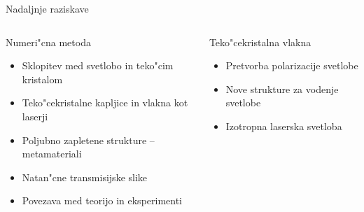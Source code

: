 \documentclass{beamer}
\begin{document}
\begin{frame}{Nadaljnje raziskave}
\begin{columns}

 
 \begin{block}{Numeri"cna metoda}
  \begin{itemize}
   \item Sklopitev med svetlobo in teko"cim kristalom
   \item Teko"cekristalne kapljice in vlakna kot laserji
   \item Poljubno zapletene strukture -- metamateriali
   \item Natan"cne transmisijske slike
   \item Povezava med teorijo in eksperimenti
  \end{itemize}
 \end{block}
 
 \begin{block}{Teko"cekristalna vlakna}
  \begin{itemize}
    \item Pretvorba polarizacije svetlobe
    \item Nove strukture za vodenje svetlobe
    \item Izotropna laserska svetloba
  \end{itemize}
 \end{block}
 
 


\end{columns}
\end{frame}
\end{document}
